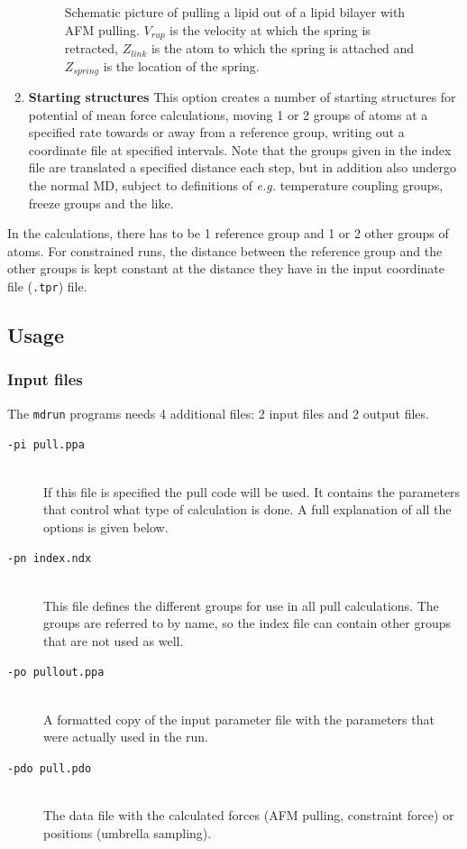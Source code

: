 \begin{enumerate}
\begin{figure}
\caption{Schematic picture of pulling a lipid out of a lipid bilayer
with AFM pulling. $V_{rup}$ is the velocity at which the spring is
retracted, $Z_{link}$ is the atom to which the spring is attached and
$Z_{spring}$ is the location of the spring.}
\label{fi:pull} 
\end{figure}   
\item{\textbf{Starting structures}} This option creates a number of
starting structures for potential of mean force calculations, moving 1
or 2 groups of atoms at a specified rate towards or away from a
reference group, writing out a coordinate file at specified intervals.
Note that the groups given in the index file are translated a
specified distance each step, but in addition also undergo the normal
MD, subject to definitions of \emph{e.g.} temperature coupling groups, freeze
groups and the like.
\end{enumerate}

In the calculations, there has to be 1 reference group and 1 or 2
other groups of atoms. For constrained runs, the distance between the
reference group and the other groups is kept constant at the distance
they have in the input coordinate file ({\tt .tpr}) file.

\subsection{Usage}

\subsubsection{Input files}

The {\tt mdrun} programs needs 4 additional files: 2 input files and 2
output files. 
\begin{description}
\item[\tt -pi pull.ppa]\mbox{}\\ If this file is specified the pull code will
be used. It contains the parameters that control what type of
calculation is done. A full explanation of all the options is given below.
\item[\tt -pn index.ndx]\mbox{}\\ This file defines the different groups for
use in all pull calculations. The groups are referred to by name, so
the index file can contain other groups that are not used as well. 
\item[\tt -po pullout.ppa]\mbox{}\\ A formatted copy of the input parameter
file with the parameters that were actually used in the run.
\item[\tt -pdo pull.pdo]\mbox{}\\ The data file with the calculated forces
(AFM pulling, constraint force) or positions (umbrella sampling).
\end{description}

